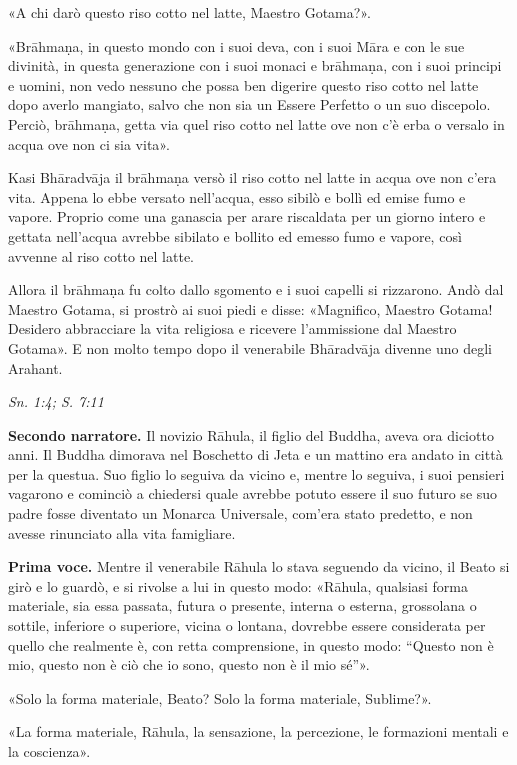 «A chi darò questo riso cotto nel latte, Maestro Gotama?».


«Brāhmaṇa, in questo mondo con i suoi deva, con i suoi Māra e con le sue
divinità, in questa generazione con i suoi monaci e brāhmaṇa, con i suoi
principi e uomini, non vedo nessuno che possa ben digerire questo riso
cotto nel latte dopo averlo mangiato, salvo che non sia un Essere
Perfetto o un suo discepolo. Perciò, brāhmaṇa, getta via quel riso cotto
nel latte ove non c’è erba o versalo in acqua ove non ci sia vita».


Kasi Bhāradvāja il brāhmaṇa versò il riso cotto nel latte in acqua ove
non c’era vita. Appena lo ebbe versato nell’acqua, esso sibilò e bollì
ed emise fumo e vapore. Proprio come una ganascia per arare riscaldata
per un giorno intero e gettata nell’acqua avrebbe sibilato e bollito ed
emesso fumo e vapore, così avvenne al riso cotto nel latte.


Allora il brāhmaṇa fu colto dallo sgomento e i suoi capelli si
rizzarono. Andò dal Maestro Gotama, si prostrò ai suoi piedi e disse:
«Magnifico, Maestro Gotama! Desidero abbracciare la vita religiosa e
ricevere l’ammissione dal Maestro Gotama». E non molto tempo dopo il
venerabile Bhāradvāja divenne uno degli Arahant.


\emph{Sn. 1:4; S. 7:11}


\textbf{Secondo narratore.} Il novizio Rāhula, il figlio del Buddha, aveva ora
diciotto anni. Il Buddha dimorava nel Boschetto di Jeta e un mattino era
andato in città per la questua. Suo figlio lo seguiva da vicino e,
mentre lo seguiva, i suoi pensieri vagarono e cominciò a chiedersi quale
avrebbe potuto essere il suo futuro se suo padre fosse diventato un
Monarca Universale, com’era stato predetto, e non avesse rinunciato alla
vita famigliare.


\textbf{Prima voce.} Mentre il venerabile Rāhula lo stava seguendo da vicino, il
Beato si girò e lo guardò, e si rivolse a lui in questo modo: «Rāhula,
qualsiasi forma materiale, sia essa passata, futura o presente, interna
o esterna, grossolana o sottile, inferiore o superiore, vicina o
lontana, dovrebbe essere considerata per quello che realmente è, con
retta comprensione, in questo modo: “Questo non è mio, questo non è ciò
che io sono, questo non è il mio sé”».


«Solo la forma materiale, Beato? Solo la forma materiale, Sublime?».


«La forma materiale, Rāhula, la sensazione, la percezione, le formazioni
mentali e la coscienza».


